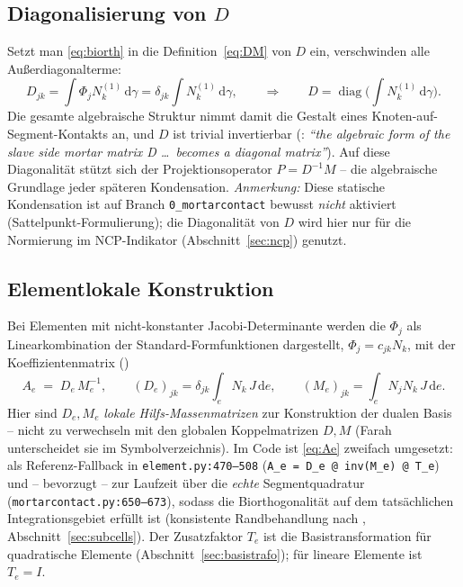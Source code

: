 \documentclass[a4paper,11pt]{article}
\def\bm#1{#1}%
\def\tilde#1{#1}%
\newcommand{\code}[1]{\texttt{\small #1}}
\newcommand{\file}[1]{\texttt{\small #1}}
\begin{document}
\subsection{Diagonalisierung von $\bm D$}
Setzt man \eqref{eq:biorth} in die Definition~\eqref{eq:DM} von $\bm D$ ein, verschwinden alle
Außerdiagonalterme:
\begin{equation}
D_{jk} = \int \Phi_j N_k^{(1)}\,\mathrm d\gamma = \delta_{jk}\int N_k^{(1)}\,\mathrm d\gamma,
\qquad\Longrightarrow\qquad \bm D = \operatorname{diag}\!\Big(\textstyle\int N_k^{(1)}\,\mathrm d\gamma\Big).
\end{equation}
Die gesamte algebraische Struktur nimmt damit die Gestalt eines Knoten-auf-Segment-Kontakts an, und
$\bm D$ ist trivial invertierbar (\citealp[Abschn.~3.4.1.2, S.~33]{farah}: \emph{``the algebraic form of the slave
side mortar matrix D \ldots\ becomes a diagonal matrix''}). Auf diese Diagonalität stützt sich der
Projektionsoperator $\bm P = \bm D^{-1}\bm M$ \citep[Gl.~(3.65)]{farah} -- die algebraische Grundlage
jeder späteren Kondensation. \emph{Anmerkung:} Diese statische Kondensation ist auf Branch
\code{0\_mortarcontact} bewusst \emph{nicht} aktiviert (Sattelpunkt-Formulierung); die Diagonalität
von $\tilde{\bm D}$ wird hier nur für die Normierung im NCP-Indikator (Abschnitt~\ref{sec:ncp}) genutzt.

\subsection{Elementlokale Konstruktion}
Bei Elementen mit nicht-konstanter Jacobi-Determinante werden die $\Phi_j$ als Linearkombination
der Standard-Formfunktionen dargestellt, $\Phi_j = c_{jk}N_k$, mit der Koeffizientenmatrix
(\citealp[Gl.~(3.53)--(3.56)]{farah})
\begin{equation}
\bm A_e \;=\; \bm D_e\,\bm M_e^{-1},
\qquad
(\bm D_e)_{jk} = \delta_{jk}\!\int_e N_k\,J\,\mathrm de,
\qquad
(\bm M_e)_{jk} = \int_e N_j N_k\,J\,\mathrm de .
\label{eq:Ae}
\end{equation}
Hier sind $\bm D_e,\bm M_e$ \emph{lokale Hilfs-Massenmatrizen} zur Konstruktion der dualen Basis --
nicht zu verwechseln mit den globalen Koppelmatrizen $\bm D,\bm M$ (Farah unterscheidet sie im
Symbolverzeichnis). Im Code ist \eqref{eq:Ae} zweifach umgesetzt: als Referenz-Fallback in
\file{element.py:\allowbreak{}470--508} (\code{A\_e = D\_e @ inv(M\_e) @ T\_e}) und -- bevorzugt -- zur Laufzeit
über die \emph{echte} Segmentquadratur (\file{mortarcontact.py:\allowbreak{}650--673}), sodass die Biorthogonalität
auf dem tatsächlichen Integrationsgebiet erfüllt ist (konsistente Randbehandlung nach
\citet{cichosz}, Abschnitt~\ref{sec:subcells}). Der Zusatzfaktor $\bm T_e$ ist die
Basistransformation für quadratische Elemente (Abschnitt~\ref{sec:basistrafo}); für lineare Elemente
ist $\bm T_e=\bm I$.
\end{document}
